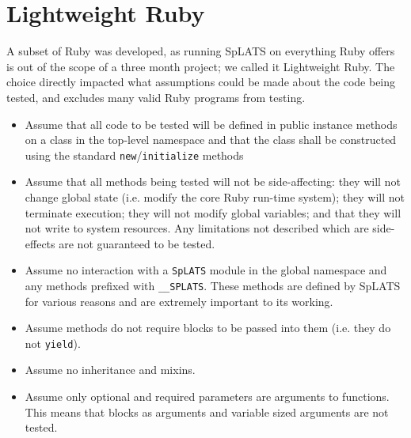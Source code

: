 \section{Lightweight Ruby}
A subset of Ruby was developed, as running SpLATS on everything Ruby offers is out of the scope of a three month project; we called it Lightweight Ruby. The choice directly impacted what assumptions could be made about the code being tested, and excludes many valid Ruby programs from testing.
\begin{itemize}
\item Assume that all code to be tested will be defined in public instance
methods on a class in the top-level namespace and that the class shall be
constructed using the standard \texttt{new}/\texttt{initialize} methods
\item Assume that all methods being tested will not be side-affecting: they will not change global state (i.e. modify the core Ruby run-time system); they will not terminate execution; they will not modify global variables; and that they will not write to system resources. Any limitations not described which are side-effects are not guaranteed to be tested.
\item Assume no interaction with a \texttt{SpLATS} module in the global namespace
and any methods prefixed with \texttt{\_\_SPLATS}. These methods are defined by SpLATS for various reasons and are extremely important to its working.
\item Assume methods do not require blocks to be passed into them (i.e. they do not
\texttt{yield}).
\item Assume no inheritance and mixins.
\item Assume only optional and required parameters are arguments to functions. This means that blocks as arguments and variable sized arguments are not tested.
\end{itemize}
